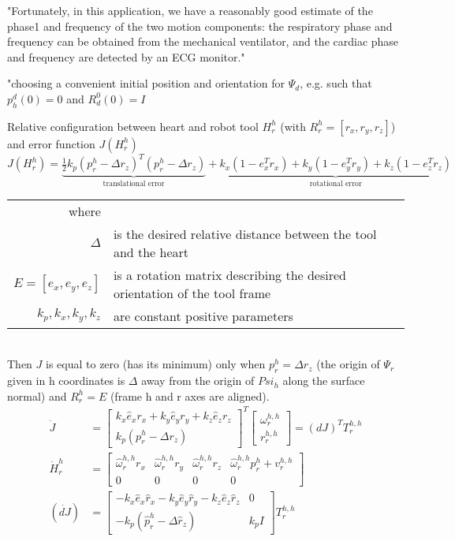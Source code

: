 "Fortunately, in this application, we have a reasonably good estimate of the phase1 and frequency of the two motion components: the respiratory phase and frequency can be obtained from the mechanical ventilator, and the cardiac phase and frequency are detected by an ECG monitor."

"choosing a convenient initial position and orientation for $\Psi_d$, e.g. such that $p^d_h(0)=0$ and $R^0_d(0) = I$

Relative configuration between heart and robot tool $H^h_r$ (with $R^h_r =[r_x, r_y, r_z]$) and error function $J(H^h_r)$
\begin{equation}
J(H^h_r) = \underbrace{\tfrac{1}{2}k_p (p^h_r-\Delta r_z)^T(p^h_r-\Delta r_z)}_\text{translational error} + \underbrace{k_x (1-e_x^T r_x) + k_y (1-e_y^T r_y) + k_z (1-e_z^T r_z)}_\text{rotational error}
\end{equation}
\begin{tabular}{rl}
	where &\\
	$\Delta$ & is the desired relative distance between the tool and the heart\\
	$E=[e_x,e_y,e_z]$ & is a rotation matrix describing the desired orientation of the tool frame\\
	$k_p,k_x,k_y,k_z$ & are constant positive parameters\\
\end{tabular}\\

Then $J$ is equal to zero (has its minimum) only when $p^h_r=\Delta r_z$ (the origin of $\Psi_r$ given in h coordinates is $\Delta$ away from the origin of $Psi_h$ along the surface normal) and $R^h_r=E$ (frame h and r axes are aligned).
\begin{align}
\dot{J} &= 
\begin{bmatrix}
k_x \hat{e}_x r_x + k_y \hat{e}_y r_y + k_z \hat{e}_z r_z\\
k_p(p^h_r - \Delta r_z)
\end{bmatrix}^T
\begin{bmatrix}
\omega^{h,h}_r \\
r^{h,h}_r
\end{bmatrix}
= (dJ)^T T^{h,h}_r\\
\dot{H}^h_r &= 
\begin{bmatrix}
\hat{\omega}^{h,h}_r r_x & \hat{\omega}^{h,h}_r r_y & \hat{\omega}^{h,h}_r r_z & \hat{\omega}^{h,h}_r p^h_r + v^{h,h}_r\\
0 & 0 & 0 & 0
\end{bmatrix}\\
(\dot{dJ}) &=
\begin{bmatrix}
-k_x \hat{e}_x \hat{r}_x  - k_y \hat{e}_y \hat{r}_y - k_z \hat{e}_z \hat{r}_z & 0\\
-k_p(\hat{p}^h_r - \Delta \hat{r}_z) & k_p I
\end{bmatrix}
T^{h,h}_r
\end{align}


